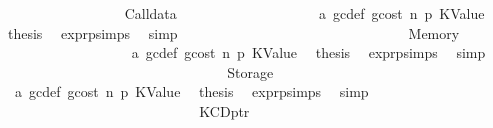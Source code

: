 \begin{isabellebody}
\isanewline
\ \ \ \ \ \ \ \ \ \ \ \ \ \ \ \ \isamarkupfalse%
\ {\isacharparenleft}{\kern0pt}Calldata\ {\isacharunderscore}{\kern0pt}{\isacharparenright}{\kern0pt}\isanewline
\ \ \ \ \ \ \ \ \ \ \ \ \ \ \ \ \isamarkupfalse%
\ {}{}{\isacharparenleft}{\kern0pt}{}{\isacharparenright}{\kern0pt}\ a{}\ gc{\isacharunderscore}{\kern0pt}def\ gcost\ n\ p{}\ KValue\ \isamarkupfalse%
\ {\isacharquery}{\kern0pt}thesis\ \isamarkupfalse%
\ expr{\isachardot}{\kern0pt}psimps{\isacharparenleft}{\kern0pt}{}{}{\isacharparenright}{\kern0pt}\ \isamarkupfalse%
\ simp\isanewline
\ \ \ \ \ \ \ \ \ \ \ \ \ \ \isamarkupfalse%
\isanewline
\ \ \ \ \ \ \ \ \ \ \ \ \ \ \ \ \isamarkupfalse%
\ {\isacharparenleft}{\kern0pt}Memory\ {\isacharunderscore}{\kern0pt}{\isacharparenright}{\kern0pt}\isanewline
\ \ \ \ \ \ \ \ \ \ \ \ \ \ \ \ \isamarkupfalse%
\ {}{}{\isacharparenleft}{\kern0pt}{}{\isacharparenright}{\kern0pt}\ a{}\ gc{\isacharunderscore}{\kern0pt}def\ gcost\ n\ p{}\ KValue\ \isamarkupfalse%
\ {\isacharquery}{\kern0pt}thesis\ \isamarkupfalse%
\ expr{\isachardot}{\kern0pt}psimps{\isacharparenleft}{\kern0pt}{}{}{\isacharparenright}{\kern0pt}\ \isamarkupfalse%
\ simp\isanewline
\ \ \ \ \ \ \ \ \ \ \ \ \ \ \isamarkupfalse%
\isanewline
\ \ \ \ \ \ \ \ \ \ \ \ \ \ \ \ \isamarkupfalse%
\ {\isacharparenleft}{\kern0pt}Storage\ {\isacharunderscore}{\kern0pt}{\isacharparenright}{\kern0pt}\isanewline
\ \ \ \ \ \ \ \ \ \ \ \ \ \ \ \ \isamarkupfalse%
\ {}{}{\isacharparenleft}{\kern0pt}{}{\isacharparenright}{\kern0pt}\ a{}\ gc{\isacharunderscore}{\kern0pt}def\ gcost\ n\ p{}\ KValue\ \isamarkupfalse%
\ {\isacharquery}{\kern0pt}thesis\ \isamarkupfalse%
\ expr{\isachardot}{\kern0pt}psimps{\isacharparenleft}{\kern0pt}{}{}{\isacharparenright}{\kern0pt}\ \isamarkupfalse%
\ simp\isanewline
\ \ \ \ \ \ \ \ \ \ \ \ \ \ \isamarkupfalse%
\isanewline
\ \ \ \ \ \ \ \ \ \ \ \ \isamarkupfalse%
\isanewline
\ \ \ \ \ \ \ \ \ \ \ \ \ \ \isamarkupfalse%
\ {\isacharparenleft}{\kern0pt}KCDptr\ {\isacharunderscore}{\kern0pt}{\isacharparenright}{\kern0pt}\isanewline

\end{isabellebody}
